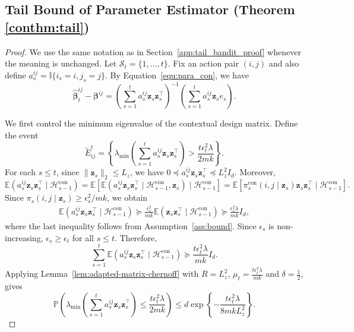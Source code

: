 \documentclass[12pt]{article}
\begin{document}
\subsection{Tail Bound of Parameter Estimator (Theorem \ref{conthm:tail})}
\label{app:conthm:tail_proof}


\begin{proof}
We use the same notation as in Section~\ref{app:tail_bandit_proof} whenever the meaning is unchanged. Let $\mathcal S_t = \{1,\ldots,t\}$. Fix an action pair $(i,j)$ and also define $a_s^{ij} = \mathbb I\{i_s=i,j_s=j\}$.
By Equation~\eqref{equ:para_con}, we have
\[
\widehat{\bm\beta}_t^{ij}
-
\bm\beta^{ij}
=
\left(\sum_{s=1}^t a_s^{ij}\bm z_s\bm z_s^\top \right)^{-1}
\left( \sum_{s=1}^t a_s^{ij}\bm z_s e_s \right).
\]

We first control the minimum eigenvalue of the contextual design matrix.
Define the event
\[
\widetilde E_{ij}^t
=
\left\{
\lambda_{\min}
\left(
\sum_{s=1}^t a_s^{ij}\bm z_s\bm z_s^\top
\right)
>
\frac{
t\epsilon_t^2\lambda
}{
2mk
}
\right\}.
\]
For each $s\le t$, since $\|\bm z_s\|_2\le L_z$, we have $0 \preceq a_s^{ij}\bm z_s\bm z_s^\top \preceq L_z^2 I_d$. Moreover, 
\begin{equation*} 
\mathbb E\left( a_s^{ij}\bm z_s\bm z_s^\top \mid \mathcal H_{s-1}^{\mathrm{con}} \right) = \mathbb E\left[ \mathbb E\left( a_s^{ij}\bm z_s\bm z_s^\top \mid \mathcal H_{s-1}^{\mathrm{con}}, \bm z_s \right) \mid \mathcal H_{s-1}^{\mathrm{con}} \right] = \mathbb E\left[ \pi_s^\mathrm{con}(i,j\mid\bm z_s) \bm z_s\bm z_s^\top \mid \mathcal H_{s-1}^{\mathrm{con}} \right]. 
\end{equation*} 
Since $\pi_s(i,j\mid\bm z_s) \ge {\epsilon_s^2}/{mk}$, we obtain 
\begin{align*} 
\mathbb E\left( a_s^{ij}\bm z_s\bm z_s^\top \mid \mathcal H_{s-1}^{\mathrm{con}} \right) \succeq \frac{\epsilon_s^2}{mk} \mathbb E\left( \bm z_s\bm z_s^\top \mid \mathcal H_{s-1}^{\mathrm{con}} \right) \succeq \frac{\epsilon_s^2\lambda}{mk} I_d, 
\end{align*} 
where the last inequality follows from Assumption~\ref{ass:bound}. Since $\epsilon_s$ is non-increasing, $\epsilon_s\ge\epsilon_t$ for all $s\le t$. Therefore, 
\[ 
\sum_{s=1}^t \mathbb E\left( a_s^{ij}\bm z_s\bm z_s^\top \mid \mathcal H_{s-1}^{\mathrm{con}} \right) \succeq \frac{ t\epsilon_t^2\lambda }{ mk } I_d. 
\] 
Applying Lemma~\ref{lem:adapted-matrix-chernoff} with $R=L_z^2$, $\mu_t = \frac{ t\epsilon_t^2\lambda }{ mk }$ and $\delta=\frac12$, gives 
\begin{equation} 
\label{equ:context-design-event} 
\mathbb P\left( \lambda_{\min} \left(
\sum_{s=1}^t a_s^{ij}\bm z_s\bm z_s^\top
\right) \le \frac{ t\epsilon_t^2\lambda }{ 2mk } \right) \le d \exp\left\{ - \frac{ t\epsilon_t^2\lambda }{ 8mkL_z^2 } \right\}. 
\end{equation}


\end{proof}
\end{document}
